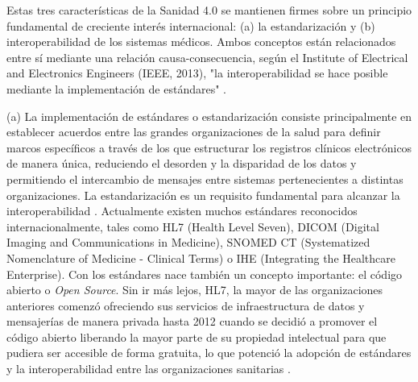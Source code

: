 Estas tres características de la Sanidad 4.0 se mantienen firmes sobre un principio fundamental de creciente interés internacional: (a) la estandarización y (b) interoperabilidad de los sistemas médicos. Ambos conceptos están relacionados entre sí mediante una relación causa-consecuencia, según el Institute of Electrical and Electronics Engineers (IEEE, 2013), "la interoperabilidad se hace posible mediante la implementación de estándares" \cite{berryman2013data}.

(a) La implementación de estándares o estandarización consiste principalmente en establecer acuerdos entre las grandes organizaciones de la salud para definir marcos específicos a través de los que estructurar los registros clínicos electrónicos de manera única, reduciendo el desorden y la disparidad de los datos y permitiendo el intercambio de mensajes entre sistemas pertenecientes a distintas organizaciones. La estandarización es un requisito fundamental para alcanzar la interoperabilidad \cite{katehakis2019framework}. Actualmente existen muchos estándares reconocidos internacionalmente, tales como HL7 (Health Level Seven), DICOM (Digital Imaging and Communications in Medicine), SNOMED CT (Systematized Nomenclature of Medicine - Clinical Terms) o IHE (Integrating the Healthcare Enterprise). Con los estándares nace también un concepto importante: el código abierto o \textit{Open Source}. Sin ir más lejos, HL7, la mayor de las organizaciones anteriores comenzó ofreciendo sus servicios de infraestructura de datos y mensajerías de manera privada hasta 2012 cuando se decidió a promover el código abierto liberando la mayor parte de su propiedad intelectual para que pudiera ser accesible de forma gratuita, lo que potenció la adopción de estándares y la interoperabilidad entre las organizaciones sanitarias \cite{berryman2013data}.

